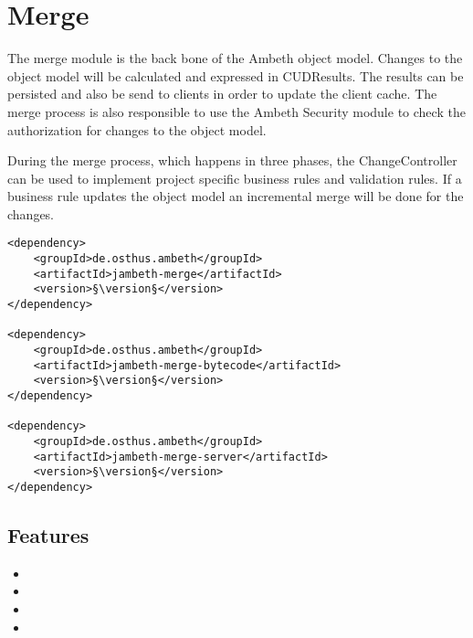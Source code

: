 \section{Merge}
\label{module:Merge}
\ClearAPI
The merge module is the back bone of the Ambeth object model. Changes to the object model will be calculated and expressed in CUDResults. The results can be persisted and also be send to clients in order to update the client cache. The merge process is also responsible to use the Ambeth Security module to check the authorization for changes to the object model.

During the merge process, which happens in three phases, the ChangeController can be used to implement project specific business rules and validation rules. If a business rule updates the object model an incremental merge will be done for the changes.

\TODO

\begin{lstlisting}[style=POM,caption={Maven modules to use \emph{Ambeth Merge}}]
<dependency>
	<groupId>de.osthus.ambeth</groupId>
	<artifactId>jambeth-merge</artifactId>
	<version>§\version§</version>
</dependency>

<dependency>
	<groupId>de.osthus.ambeth</groupId>
	<artifactId>jambeth-merge-bytecode</artifactId>
	<version>§\version§</version>
</dependency>

<dependency>
	<groupId>de.osthus.ambeth</groupId>
	<artifactId>jambeth-merge-server</artifactId>
	<version>§\version§</version>
</dependency>
\end{lstlisting}
\subsection{Features}
\begin{itemize}
	\item {}
	\item {}
	\item {}
	\item {}
\end{itemize}


